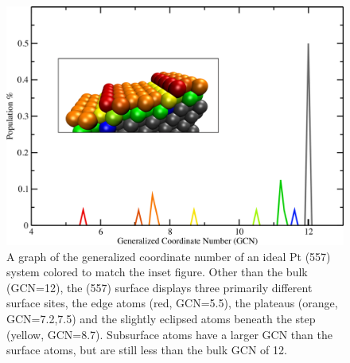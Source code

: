 
\chapter{}
\label{app:SI2}

\begin{figure}
\includegraphics[width=\linewidth]{../figures/appB/557_ideal_gcn.pdf}
\caption{A graph of the generalized coordinate number of an ideal Pt (557)
system colored to match the inset figure. Other than the bulk (GCN=12), the
(557) surface displays three primarily different surface sites, the edge atoms
(red, GCN=5.5), the plateaus (orange, GCN=7.2,7.5) and the slightly eclipsed
atoms beneath the step (yellow, GCN=8.7). Subsurface atoms have a larger GCN
than the surface atoms, but are still less than the bulk GCN of 12.}
\label{fig:557GCN}
\end{figure}


\newpage




